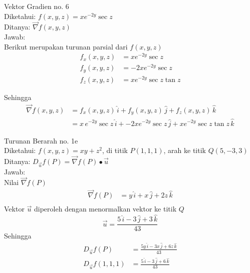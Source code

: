 \documentclass{article}
\begin{document}
    Vektor Gradien no. 6 \\
    Diketahui: \(f(x, y, z) = x e^{-2y} \sec z\) \\
    Ditanya: \(\vec{\nabla}f(x, y, z)\) \\
    Jawab: \\
    Berikut merupakan turunan parsial dari \(f(x, y, z)\)
    \begin{displaymath}
        \begin{split}
            f_{x}(x, y, z) & = x e^{-2y} \sec z \\
            f_{y}(x, y, z) & = -2x e^{-2y} \sec z \\
            f_{z}(x, y, z) & = x e^{-2y} \sec z \tan z
        \end{split}
    \end{displaymath}

    Sehingga
    \begin{displaymath}
        \begin{split}
            \vec{\nabla}f(x, y, z) & = f_{x}(x, y, z) \, \hat{i} + f_{y}(x, y, z) \, \hat{j} + f_{z}(x, y, z) \, \hat{k} \\
            & = x \, e^{-2y} \sec z \, \hat{i} + -2x e^{-2y} \sec z \, \hat{j} + x e^{-2y} \sec z \tan z \, \hat{k}
        \end{split}
    \end{displaymath}

    Turunan Berarah no. 1e \\
    Diketahui: \(f(x, y, z) = xy + z^2 \), di titik \(P(1, 1, 1)\), arah ke titik \(Q(5, -3, 3)\) \\
    Ditanya: \(D_{\vec{u}}f(P) = \vec{\nabla} f(P) \bullet \vec{u}\) \\
    Jawab: \\
    Nilai \(\vec{\nabla} f(P)\)
    \begin{displaymath}
        \begin{split}
            \vec{\nabla}f(P) & = y \, \hat{i} + x \, \hat{j} + 2z \, \hat{k} \\
        \end{split}
    \end{displaymath}
    Vektor \(\vec{u}\) diperoleh dengan menormalkan vektor ke titik \(Q\)
    \begin{displaymath}
        \vec{u} = \frac{5 \, \hat {i} -3 \, \hat{j} + 3 \, \hat{k}}{43}
    \end{displaymath}
    Sehingga
    \begin{displaymath}
        \begin{split}
            D_{\vec{u}}f(P) & = \frac{5y \, \hat{i} -3x \, \hat{j} +6z \, \hat{k}}{43} \\
            D_{\vec{u}}f(1, 1, 1) & = \frac{5 \, \hat{i} -3 \, \hat{j} +6 \, \hat{k}}{43}
        \end{split}
    \end{displaymath}
    \pagebreak
\end{document}
